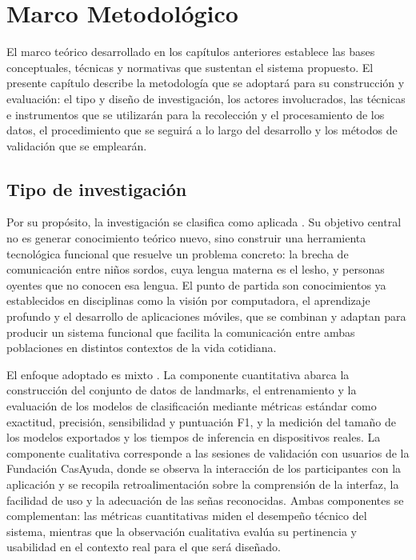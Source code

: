 \chapter[Marco Metodológico]{Marco Metodológico}
\label{ch:metodologia}

\insertminitoc
\parindent0pt

El marco teórico desarrollado en los capítulos anteriores establece las bases conceptuales,
técnicas y normativas que sustentan el sistema propuesto. El presente capítulo describe
la metodología que se adoptará para su construcción y evaluación: el tipo y diseño de
investigación, los actores involucrados, las técnicas e instrumentos que se utilizarán para la
recolección y el procesamiento de los datos, el procedimiento que se seguirá a lo largo del
desarrollo y los métodos de validación que se emplearán.

\section{Tipo de investigación}

Por su propósito, la investigación se clasifica como aplicada \cite{sampieri_metodologia_2014}.
Su objetivo central no es generar conocimiento teórico nuevo, sino construir una
herramienta tecnológica funcional que resuelve un problema concreto: la brecha de
comunicación entre niños sordos, cuya lengua materna es el \acrshort{lesho}, y personas
oyentes que no conocen esa lengua. El punto de partida son conocimientos ya establecidos
en disciplinas como la visión por computadora, el aprendizaje profundo y el desarrollo
de aplicaciones móviles, que se combinan y adaptan para producir un sistema funcional
que facilita la comunicación entre ambas poblaciones en distintos contextos de la vida
cotidiana.

El enfoque adoptado es mixto \cite{sampieri_metodologia_2014}. La componente cuantitativa
abarca la construcción del conjunto de datos de landmarks, el entrenamiento y la
evaluación de los modelos de clasificación mediante métricas estándar como exactitud,
precisión, sensibilidad y puntuación F1, y la medición del tamaño de los modelos
exportados y los tiempos de inferencia en dispositivos reales. La componente cualitativa
corresponde a las sesiones de validación con usuarios de la Fundación CasAyuda,
donde se observa la interacción de los
participantes con la aplicación y se recopila retroalimentación sobre la comprensión de
la interfaz, la facilidad de uso y la adecuación de las señas reconocidas. Ambas
componentes se complementan: las métricas cuantitativas miden el desempeño técnico del
sistema, mientras que la observación cualitativa evalúa su pertinencia y usabilidad en
el contexto real para el que será diseñado.

